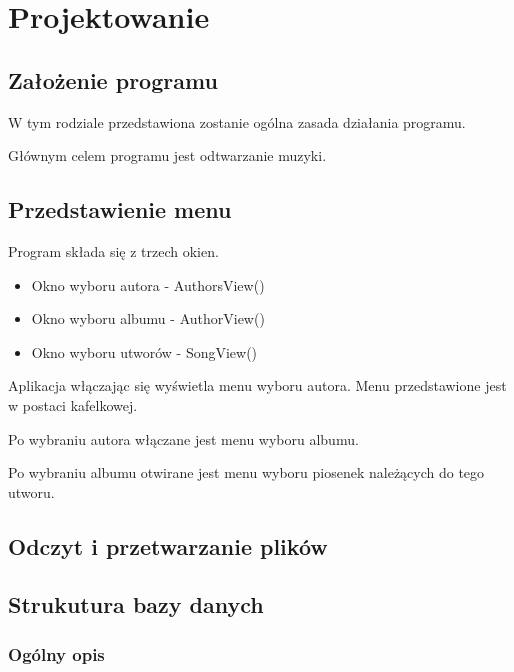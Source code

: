 	\newpage
\section{Projektowanie}		%

\subsection{Założenie programu}
W tym rodziale przedstawiona zostanie ogólna zasada działania programu.

Głównym celem programu jest odtwarzanie muzyki.

\subsection{Przedstawienie menu}

Program składa się z trzech okien.

\begin{itemize}
	\item Okno wyboru autora - AuthorsView()
	\item Okno wyboru albumu - AuthorView()
	\item Okno wyboru utworów - SongView()
\end{itemize}

Aplikacja włączając się wyświetla menu wyboru autora. Menu przedstawione jest w postaci kafelkowej.

Po wybraniu autora włączane jest menu wyboru albumu.

Po wybraniu albumu otwirane jest menu wyboru piosenek należących do tego utworu.

\subsection{Odczyt i przetwarzanie plików}

\subsection{Strukutura bazy danych}

\subsubsection{Ogólny opis}

